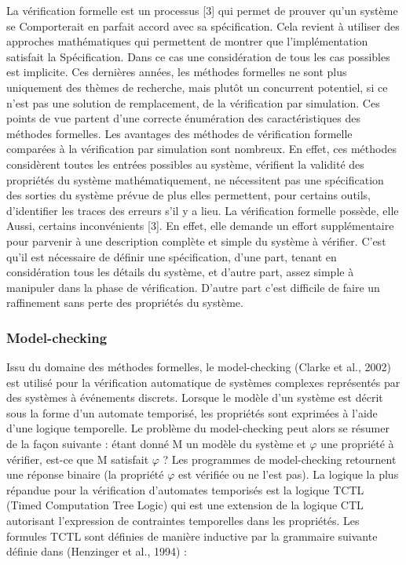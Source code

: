 \documentclass[french]{spimufcphdthesis}
\begin{document}
 La vérification formelle    est un processus [3] qui   permet   de   prouver   qu’un   système   se 
Comporterait    en    parfait    accord    avec    sa spécification.   Cela   revient   à   utiliser   des approches mathématiques qui permettent de montrer   que   l’implémentation   satisfait   la  
Spécification. Dans ce cas une considération de tous les cas possibles est implicite. Ces dernières années, les méthodes formelles ne sont plus uniquement des thèmes de recherche, mais plutôt un concurrent potentiel, si ce n’est pas une solution de remplacement, de la vérification par simulation. Ces points de vue partent d’une correcte énumération des caractéristiques des méthodes formelles. Les avantages des méthodes de vérification formelle comparées à la vérification par simulation sont nombreux. En effet, ces méthodes considèrent toutes les entrées possibles au système, vérifient la validité des propriétés du système mathématiquement, ne nécessitent pas une spécification des sorties du système prévue de plus elles permettent, pour certains outils, d’identifier les traces des erreurs s’il y a lieu. La vérification formelle possède, elle 
Aussi, certains inconvénients [3]. En effet, elle demande un effort supplémentaire pour parvenir à une description complète et simple du système à vérifier. C’est qu’il est nécessaire de définir une spécification, d’une part, tenant en considération tous les détails du système, et d’autre part, assez simple à manipuler dans la phase de vérification. D’autre part c’est difficile de faire un raffinement sans perte des propriétés du système. 

\subsubsection{Model-checking}

 Issu du domaine des méthodes formelles, le model-checking (Clarke et al., 2002) est utilisé pour la vérification automatique de systèmes complexes représentés par des
systèmes à événements discrets. Lorsque le modèle d’un système est décrit sous la forme d’un automate temporisé, les propriétés sont exprimées à l’aide d’une logique temporelle. Le problème du model-checking peut alors se résumer de la façon suivante : étant donné M un modèle du système et
$\varphi$ une propriété à vérifier, est-ce que M satisfait $\varphi$ ? Les programmes de model-checking retournent une réponse binaire (la propriété $\varphi$ est vérifiée ou ne l’est pas).
La logique la plus répandue pour la vérification d’automates temporisés est la logique TCTL (Timed Computation Tree Logic) qui est une extension de la logique CTL autorisant l’expression de contraintes temporelles dans les propriétés. Les formules TCTL sont définies de manière inductive par la grammaire suivante définie dans (Henzinger et al., 1994) :
\end{document}
